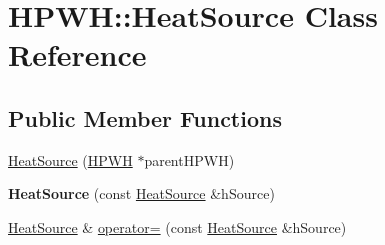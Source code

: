 \hypertarget{class_h_p_w_h_1_1_heat_source}{\section{H\-P\-W\-H\-:\-:Heat\-Source Class Reference}
\label{class_h_p_w_h_1_1_heat_source}
}
\subsection*{Public Member Functions}
\begin{DoxyCompactItemize}
\item 
\hyperlink{class_h_p_w_h_1_1_heat_source_a6b2b891c698174c8ed85f10f7b935cd4}{Heat\-Source} (\hyperlink{class_h_p_w_h}{H\-P\-W\-H} $\ast$parent\-H\-P\-W\-H)
\item 
\hypertarget{class_h_p_w_h_1_1_heat_source_a49a0d217365e1fbbf4865a9c8dc1f658}{{\bfseries Heat\-Source} (const \hyperlink{class_h_p_w_h_1_1_heat_source}{Heat\-Source} \&h\-Source)}\label{class_h_p_w_h_1_1_heat_source_a49a0d217365e1fbbf4865a9c8dc1f658}

\item 
\hypertarget{class_h_p_w_h_1_1_heat_source_a4882ea32f0fca3b0b3f2f739f0ad4f9e}{\hyperlink{class_h_p_w_h_1_1_heat_source}{Heat\-Source} \& \hyperlink{class_h_p_w_h_1_1_heat_source_a4882ea32f0fca3b0b3f2f739f0ad4f9e}{operator=} (const \hyperlink{class_h_p_w_h_1_1_heat_source}{Heat\-Source} \&h\-Source)}\label{class_h_p_w_h_1_1_heat_source_a4882ea32f0fca3b0b3f2f739f0ad4f9e}


\end{DoxyCompactItemize}
